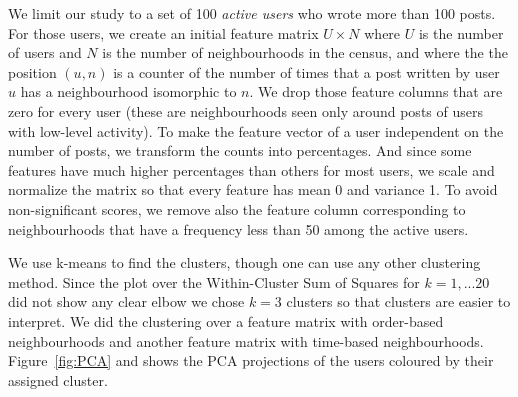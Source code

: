 \documentclass[conference]{IEEEtran}
\begin{document}
We limit our study to a set of 100 \textit{active users} who wrote more than 100 posts. For those users, we create an initial feature matrix $U\times N$ where $U$ is the number of users and $N$ is the number of neighbourhoods in the census, and where the the position $(u,n)$ is a counter of the number of times that a post written by user $u$ has a neighbourhood isomorphic to $n$. We drop those feature columns that are zero for every user (these are neighbourhoods seen only around posts of users with low-level activity). To make the feature vector of a user independent on the number of posts, we transform the counts into percentages. And since some features have much higher percentages than others for most users, we scale and normalize the matrix so that every feature has mean 0 and variance 1. To avoid non-significant scores, we remove also the feature column corresponding to neighbourhoods that have a frequency less than 50 among the active users.

We use k-means to find the clusters, though one can use any other clustering method. Since the plot over the Within-Cluster Sum of Squares for $k=1,...20$ did not show any clear elbow we chose $k=3$ clusters so that clusters are easier to interpret. We did the clustering over a feature matrix with order-based neighbourhoods and another feature matrix with time-based neighbourhoods. Figure~\ref{fig:PCA} and shows the PCA projections of the users coloured by their assigned cluster. 



\end{document}
